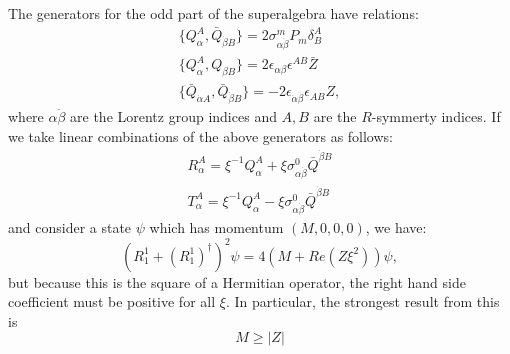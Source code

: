 \begin{example}[$d=4$,$\sn=2$]
The generators for the odd part of the superalgebra have relations:
\begin{gather}
  \{Q_\alpha^A,\bar{Q}_{\dot{\beta}B}\} = 2\sigma^m_{\alpha\dot{\beta}}P_m\delta^A_B \\
  \{Q_\alpha^A,Q_{\beta B}\} = 2\epsilon_{\alpha\beta}\epsilon^{AB}\bar{Z}\\
  \{\bar{Q}_{\dot{\alpha}A},\bar{Q}_{\dot{\beta}B}\}
  = -2\epsilon_{\dot{\alpha}\dot{\beta}}\epsilon_{AB}Z,
\end{gather}
where $\alpha\dot{\beta}$ are the Lorentz group indices and $A,B$ are the
$R$-symmerty indices.
If we take linear combinations of the above generators as follows:
\begin{gather}
  R_\alpha^A = \xi^{-1}Q_\alpha^A
  + \xi\sigma^0_{\alpha\dot{\beta}}\bar{Q}^{\dot{\beta}B}\\
  T_\alpha^A = \xi^{-1}Q_\alpha^A - \xi\sigma^0_{\alpha\dot{\beta}}\bar{Q}^{\dot{\beta}B}
\end{gather}
and consider a state $\psi$ which has momentum $(M,0,0,0)$, we have:
\begin{equation}
  \left(R_1^1+(R_1^1)^\dagger\right)^2\psi = 4(M+Re(Z\xi^2))\psi,
\end{equation}
but because this is the square of a Hermitian operator, the right hand side
coefficient must be positive for all $\xi$. In particular, the strongest result from this is
\begin{equation}
  M\geq|Z|
\end{equation}
\end{example}
